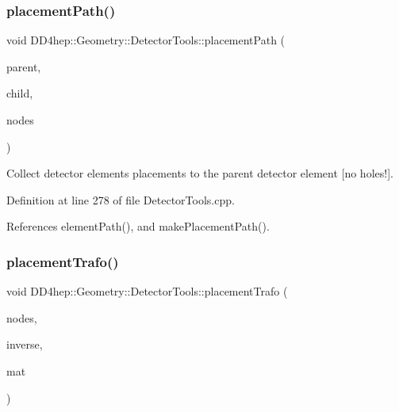 \subsubsection{\texorpdfstring{placement\+Path()}{placementPath()}\hspace{0.1cm}{\footnotesize\ttfamily [5/5]}}
{\footnotesize\ttfamily void D\+D4hep\+::\+Geometry\+::\+Detector\+Tools\+::placement\+Path (\begin{DoxyParamCaption}\item[{\hyperlink{class_d_d4hep_1_1_geometry_1_1_det_element}{Det\+Element}}]{parent,  }\item[{\hyperlink{class_d_d4hep_1_1_geometry_1_1_det_element}{Det\+Element}}]{child,  }\item[{\hyperlink{namespace_d_d4hep_1_1_geometry_1_1_detector_tools_a6cc33285199e04dd336a33e6e62925e6}{Placement\+Path} \&}]{nodes }\end{DoxyParamCaption})}



Collect detector elements placements to the parent detector element \mbox{[}no holes!\mbox{]}. 



Definition at line 278 of file Detector\+Tools.\+cpp.



References element\+Path(), and make\+Placement\+Path().

\hypertarget{namespace_d_d4hep_1_1_geometry_1_1_detector_tools_a08fe6233324d561934a33569d4548435}{}\label{namespace_d_d4hep_1_1_geometry_1_1_detector_tools_a08fe6233324d561934a33569d4548435} 
\subsubsection{\texorpdfstring{placement\+Trafo()}{placementTrafo()}\hspace{0.1cm}{\footnotesize\ttfamily [1/2]}}
{\footnotesize\ttfamily void D\+D4hep\+::\+Geometry\+::\+Detector\+Tools\+::placement\+Trafo (\begin{DoxyParamCaption}\item[{const \hyperlink{namespace_d_d4hep_1_1_geometry_1_1_detector_tools_a6cc33285199e04dd336a33e6e62925e6}{Placement\+Path} \&}]{nodes,  }\item[{bool}]{inverse,  }\item[{T\+Geo\+H\+Matrix $\ast$\&}]{mat }\end{DoxyParamCaption})}



